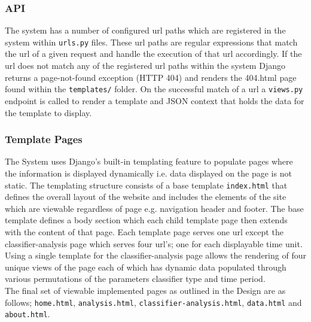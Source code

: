 \documentclass[11pt]{report}
\begin{document}
\subsubsection*{API}
The system has a number of configured url paths which are registered in the system within \texttt{urls.py} files. These url paths are regular expressions that match the url of a given request and handle the execution of that url accordingly. If the url does not match any of the registered url paths within the system Django returns a page-not-found exception (HTTP 404) and renders the 404.html page found within the \texttt{templates/} folder. On the successful match of a url a \texttt{views.py} endpoint is called to render a template and JSON context that holds the data for the template to display.

\subsubsection*{Template Pages}
The System uses Django's built-in templating feature to populate pages where the information is displayed dynamically i.e. data displayed on the page is not static. The templating structure consists of a base template \texttt{index.html} that defines the overall layout of the website and includes the elements of the site which are viewable regardless of page e.g. navigation header and footer. The base template defines a body section which each child template page then extends with the content of that page. Each template page serves one url except the classifier-analysis page which serves four url's; one for each displayable time unit. Using a single template for the classifier-analysis page allows the rendering of four unique views of the page each of which has dynamic data populated through various permutations of the parameters classifier type and time period.
\\

The final set of viewable implemented pages as outlined in the Design are as follows; \texttt{home.html}, \texttt{analysis.html}, \texttt{classifier-analysis.html}, \texttt{data.html} and \texttt{about.html}.
\end{document}
